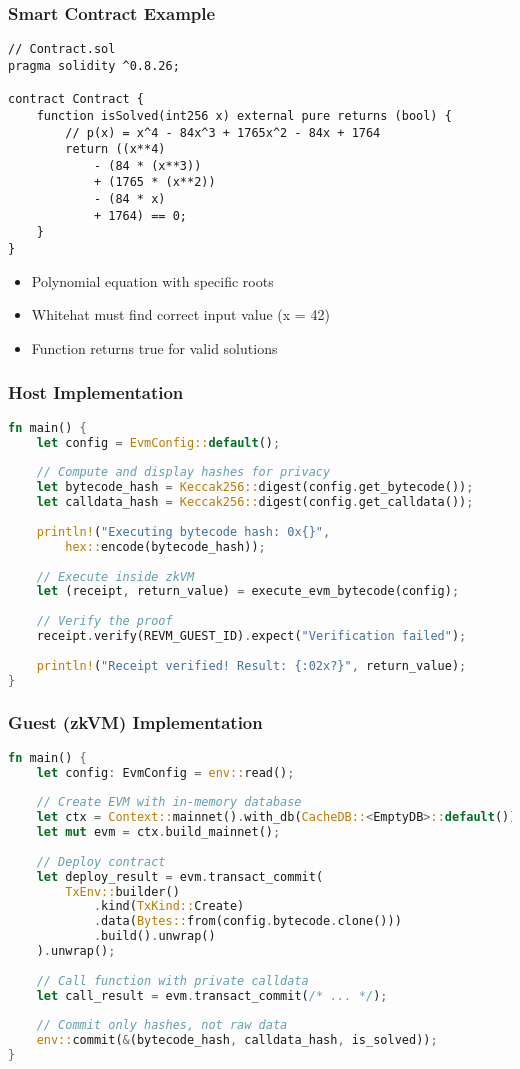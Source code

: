\documentclass{beamer}
\begin{document}
\begin{frame}[fragile]
\frametitle{Smart Contract Example}
\begin{lstlisting}[language=Solidity]
// Contract.sol
pragma solidity ^0.8.26;

contract Contract {
    function isSolved(int256 x) external pure returns (bool) {
        // p(x) = x^4 - 84x^3 + 1765x^2 - 84x + 1764
        return ((x**4)
            - (84 * (x**3))
            + (1765 * (x**2))
            - (84 * x)
            + 1764) == 0;
    }
}
\end{lstlisting}
\begin{itemize}
    \item Polynomial equation with specific roots
    \item Whitehat must find correct input value (x = 42)
    \item Function returns true for valid solutions
\end{itemize}
\end{frame}

\begin{frame}[fragile]
\frametitle{Host Implementation}
\begin{lstlisting}[language=Rust, basicstyle=\ttfamily\tiny]
fn main() {
    let config = EvmConfig::default();
    
    // Compute and display hashes for privacy
    let bytecode_hash = Keccak256::digest(config.get_bytecode());
    let calldata_hash = Keccak256::digest(config.get_calldata());
    
    println!("Executing bytecode hash: 0x{}", 
        hex::encode(bytecode_hash));
    
    // Execute inside zkVM
    let (receipt, return_value) = execute_evm_bytecode(config);
    
    // Verify the proof
    receipt.verify(REVM_GUEST_ID).expect("Verification failed");
    
    println!("Receipt verified! Result: {:02x?}", return_value);
}
\end{lstlisting}
\end{frame}

\begin{frame}[fragile]
\frametitle{Guest (zkVM) Implementation}
\begin{lstlisting}[language=Rust, basicstyle=\ttfamily\tiny]
fn main() {
    let config: EvmConfig = env::read();
    
    // Create EVM with in-memory database
    let ctx = Context::mainnet().with_db(CacheDB::<EmptyDB>::default());
    let mut evm = ctx.build_mainnet();
    
    // Deploy contract
    let deploy_result = evm.transact_commit(
        TxEnv::builder()
            .kind(TxKind::Create)
            .data(Bytes::from(config.bytecode.clone()))
            .build().unwrap()
    ).unwrap();
    
    // Call function with private calldata
    let call_result = evm.transact_commit(/* ... */);
    
    // Commit only hashes, not raw data
    env::commit(&(bytecode_hash, calldata_hash, is_solved));
}
\end{lstlisting}
\end{frame}
\end{document}
